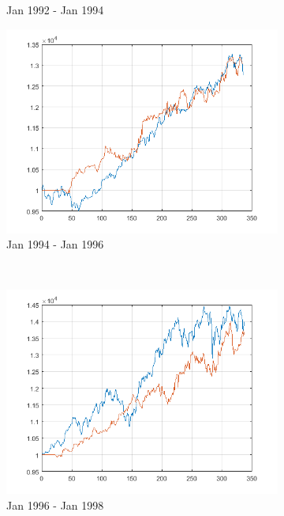 \documentclass[11pt,a4,twosided,singlespacing,titlepagenumber=on]{scrreprt}
\numberwithin{equation}{chapter} %
\theoremstyle{remark}
\begin{document}
\begin{figure}[H]
\begin{subfigure}[t]{0.32\textwidth}
        \caption{Jan 1992 - Jan 1994}
    \end{subfigure}
    \begin{subfigure}[t]{0.32\textwidth}
        \centering
        \includegraphics[width=1\textwidth]{res/backtest_cpx/3}
        \caption{Jan 1994 - Jan 1996}
    \end{subfigure} \\
    \begin{subfigure}[t]{0.32\textwidth}
        \centering
        \includegraphics[width=1\textwidth]{res/backtest_cpx/4}
        \caption{Jan 1996 - Jan 1998}
    \end{subfigure}
    \begin{subfigure}[t]{0.32\textwidth}

\end{subfigure}
\end{figure}
\end{document}
